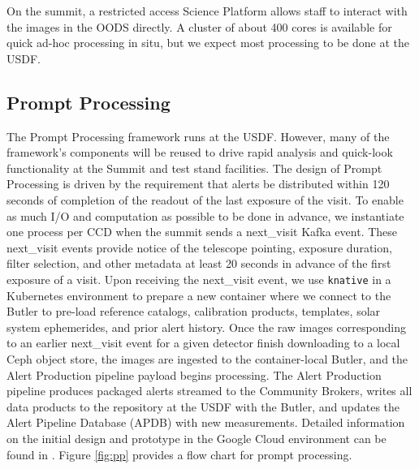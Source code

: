 \documentclass[11pt,twoside]{article}
\begin{document}
On the summit, a restricted access Science Platform allows staff to interact with the images in the OODS directly.
A cluster of about 400 cores is available for quick ad-hoc processing in situ, but we expect most processing to be done at the USDF.

\subsection{Prompt Processing} \label{sec:prompt}
The Prompt Processing framework runs at the USDF. However, many of the framework's components will be reused to drive rapid analysis and quick-look functionality at the Summit and test stand facilities.
The design of Prompt Processing is driven by the requirement that alerts be distributed within 120 seconds of completion of the readout of the last exposure of the visit.
To enable as much I/O and computation as possible to be done in advance, we instantiate one process per CCD when the summit sends a next\_visit Kafka event.
These next\_visit events provide notice of the telescope pointing, exposure duration, filter selection, and other metadata at least 20 seconds in advance of the first exposure of a visit.
Upon receiving the next\_visit event, we use \texttt{knative} in a Kubernetes environment to prepare a new container where we connect to the Butler to pre-load reference catalogs, calibration products, templates, solar system ephemerides, and prior alert history.
Once the raw images corresponding to an earlier next\_visit event for a given detector finish downloading to a local Ceph object store, the images are ingested to the container-local Butler, and the Alert Production pipeline payload begins processing.
The Alert Production pipeline produces packaged alerts streamed to the Community Brokers, writes all data products to the repository at the USDF with the Butler, and updates the Alert Pipeline Database (APDB) with new measurements.
Detailed information on the initial design and prototype in the Google Cloud environment can be found in \citet{DMTN-219}.
Figure \ref{fig:pp} provides a flow chart for prompt processing.

\begin{centering}
\end{centering}
\end{document}
